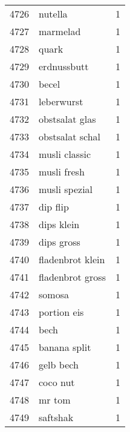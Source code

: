 \begin{tabular}{llr}
4726 &                                            nutella &      1 \\
4727 &                                           marmelad &      1 \\
4728 &                                              quark &      1 \\
4729 &                                        erdnussbutt &      1 \\
4730 &                                              becel &      1 \\
4731 &                                         leberwurst &      1 \\
4732 &                                     obstsalat glas &      1 \\
4733 &                                    obstsalat schal &      1 \\
4734 &                                      musli classic &      1 \\
4735 &                                        musli fresh &      1 \\
4736 &                                      musli spezial &      1 \\
4737 &                                           dip flip &      1 \\
4738 &                                         dips klein &      1 \\
4739 &                                         dips gross &      1 \\
4740 &                                   fladenbrot klein &      1 \\
4741 &                                   fladenbrot gross &      1 \\
4742 &                                             somosa &      1 \\
4743 &                                        portion eis &      1 \\
4744 &                                               bech &      1 \\
4745 &                                       banana split &      1 \\
4746 &                                          gelb bech &      1 \\
4747 &                                           coco nut &      1 \\
4748 &                                             mr tom &      1 \\
4749 &                                           saftshak &      1 \\

\end{tabular}
